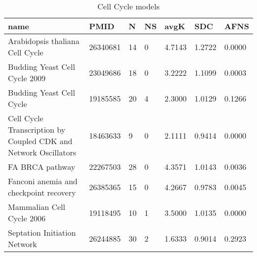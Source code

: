 \begin{table}
\caption{Cell Cycle models}
\label{tab:Cell_Cycle}
\begin{tabular}{|p{180pt}||p{40pt}|p{25pt}|p{25pt}|p{40pt}|p{25pt}|p{25pt}|}
\toprule
name & PMID & N & NS & avgK & SDC & AFNS \\
\midrule
Arabidopsis thaliana Cell Cycle & 26340681 & 14 & 0 & 4.7143 & 1.2722 & 0.0000 \\
Budding Yeast Cell Cycle 2009 & 23049686 & 18 & 0 & 3.2222 & 1.1099 & 0.0003 \\
Budding Yeast Cell Cycle & 19185585 & 20 & 4 & 2.3000 & 1.0129 & 0.1266 \\
Cell Cycle Transcription by Coupled CDK and Network Oscillators & 18463633 & 9 & 0 & 2.1111 & 0.9414 & 0.0000 \\
FA BRCA pathway & 22267503 & 28 & 0 & 4.3571 & 1.0143 & 0.0036 \\
Fanconi anemia and checkpoint recovery & 26385365 & 15 & 0 & 4.2667 & 0.9783 & 0.0045 \\
Mammalian Cell Cycle 2006 & 19118495 & 10 & 1 & 3.5000 & 1.0135 & 0.0000 \\
Septation Initiation Network & 26244885 & 30 & 2 & 1.6333 & 0.9014 & 0.2923 \\
\bottomrule
\end{tabular}
\end{table}
